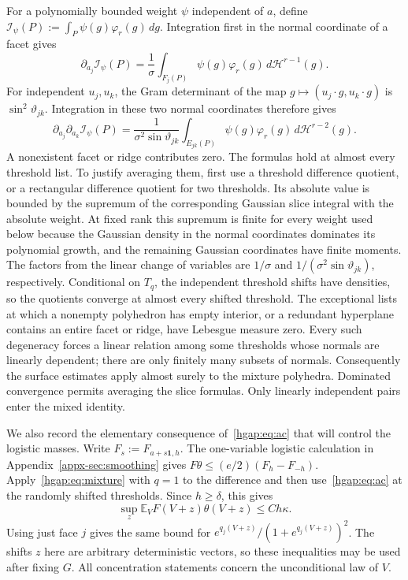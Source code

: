 \documentclass[11pt,letterpaper,twoside,leqno]{article}
\theoremstyle{bookplain}
\theoremstyle{bookremark}
\newcommand{\E}{\mathbb E}
\newcommand{\dd}{\,d}
\begin{document}
For a polynomially bounded weight $\psi$ independent of $a$, define
$\mathcal I_\psi(P):=\int_P\psi(g)\varphi_r(g)\dd g$.
Integration first in the normal coordinate of a facet gives
\begin{equation}\label{hgap:eq:coarea-one}
 \partial_{a_j}\mathcal I_\psi(P)
     =\frac1\sigma\int_{F_j(P)}\psi(g)\varphi_r(g)
                                  \dd\mathcal H^{r-1}(g).
\end{equation}
For independent $u_j,u_k$, the Gram determinant of the map
$g\mapsto(u_j\cdot g,u_k\cdot g)$ is $\sin^2\vartheta_{jk}$.
Integration in these two normal coordinates therefore gives
\begin{equation}\label{hgap:eq:coarea-two}
 \partial_{a_j}\partial_{a_k}\mathcal I_\psi(P)
     =\frac1{\sigma^2\sin\vartheta_{jk}}
       \int_{E_{jk}(P)}\psi(g)\varphi_r(g)
                                  \dd\mathcal H^{r-2}(g).
\end{equation}
A nonexistent facet or ridge contributes zero. The formulas hold at
almost every threshold list. To justify averaging them, first use a
threshold difference quotient, or a rectangular difference quotient
for two thresholds. Its absolute value is bounded
by the supremum of the corresponding Gaussian slice integral with the
absolute weight. At fixed rank this supremum is finite for every weight
used below because the Gaussian density in the normal coordinates dominates
its polynomial growth, and the remaining Gaussian coordinates have
finite moments. The factors from the linear change of variables are
$1/\sigma$ and $1/(\sigma^2\sin\vartheta_{jk})$, respectively.
Conditional on $T_q$, the independent threshold shifts have densities,
so the quotients converge at almost every shifted threshold. The
exceptional lists at which a nonempty polyhedron has empty interior,
or a redundant hyperplane contains an entire facet or ridge, have
Lebesgue measure zero. Every such degeneracy forces a linear relation
among some thresholds whose normals are linearly dependent; there
are only finitely many subsets of normals. Consequently the surface
estimates apply almost surely to the mixture polyhedra. Dominated
convergence permits averaging the slice formulas. Only linearly
independent pairs enter the mixed identity.

We also record the elementary consequence of~\eqref{hgap:eq:ac} that
will control the logistic masses. Write $F_s:=F_{a+s\mathbf1,h}$.
The one-variable logistic calculation in
Appendix~\ref{appx-sec:smoothing} gives
$F\theta\le (e/2)(F_h-F_{-h})$. Apply~\eqref{hgap:eq:mixture} with
$q=1$ to the difference and then use~\eqref{hgap:eq:ac} at the randomly
shifted thresholds. Since $h\ge\delta$, this gives
\begin{equation}\label{hgap:eq:logistic-mass}
 \sup_z\E_V F(V+z)\theta(V+z)\le Ch\kappa.
\end{equation}
Using just face $j$ gives the same bound for
$e^{q_j(V+z)}/(1+e^{q_j(V+z)})^2$. The shifts $z$ here are arbitrary
deterministic vectors, so these inequalities may be used after fixing
$G$. All concentration statements concern the unconditional law of $V$.
\end{document}
